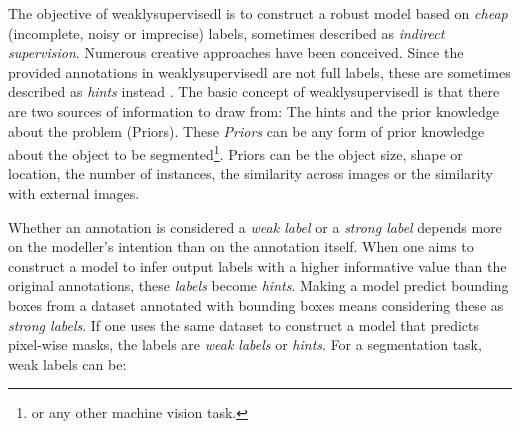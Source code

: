 \par{
    The objective of \Gls{weaklysupervisedl} is to construct a robust model based on \textit{cheap} (incomplete, noisy or imprecise) labels, sometimes described as \textit{indirect supervision}.
    Numerous creative approaches have been conceived.
    Since the provided annotations in \Gls{weaklysupervisedl} are not full labels, these are sometimes described as \textit{hints} instead \cite{ECCV2020}.
    The basic concept of \Gls{weaklysupervisedl} is that there are two sources of information to draw from: The hints and the prior knowledge about the problem (Priors).
    These \textit{Priors} can be any form of prior knowledge about the object to be segmented\footnote{or any other machine vision task.}.
    Priors can be the object size, shape or location, the number of instances, the similarity across images or the similarity with external images.
}
\par{
    Whether an annotation is considered a \textit{weak label} or a \textit{strong label} depends more on the modeller's intention than on the annotation itself. 
    When one aims to construct a model to infer output labels with a higher informative value than the original annotations, these \textit{labels} become \textit{hints}.
    Making a model predict bounding boxes from a dataset annotated with bounding boxes means considering these as \textit{strong labels}. 
    If one uses the same dataset to construct a model that predicts pixel-wise masks, the labels are \textit{weak labels} or \textit{hints}.
}
For a segmentation task, weak labels can be:
